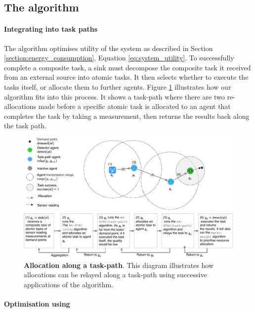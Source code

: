\newcommand{\functionANHTAO}[2]{
	\functionSignature{\texttt{anhtao-path}}{\varAtomicTask{}{}, \varAgent{}{}}
}

\subsection{The \acronymWSNOptimisationExtended{}{} algorithm}
\label{section:solution_anhtao}

\paragraph{Integrating \acronymWSNOptimisation{}{} into task paths}

The \acronymWSNOptimisation{}{} algorithm optimises utility of the system as described in Section \ref{section:energy_consumption}, Equation \ref{eq:system_utility}. 
To successfully complete a composite task, a sink must decompose the composite task it received from an external source into atomic tasks. It then selects whether to execute the tasks itself, or allocate them to further agents.  Figure \ref{fig:arc-flow}  illustrates how our algorithm fits into this process. It shows a task-path where there are two re-allocations made before a specific atomic task is allocated to an agent that completes the task by taking a measurement, then returns the results back along the task path.
\begin{figure}[ht]
	\centering
	\includegraphics[width=0.8\linewidth, trim={72pt 0pt 62pt 0pt, clip}]{arc-flow}
	\caption{\textbf{Allocation along a task-path}. This diagram illustrates how allocations can be relayed along a task-path using successive applications of the \acronymATARIA{}{} algorithm.}
	\label{fig:arc-flow}
\end{figure}

\paragraph{Optimisation using \acronymWSNOptimisation{}{}}

